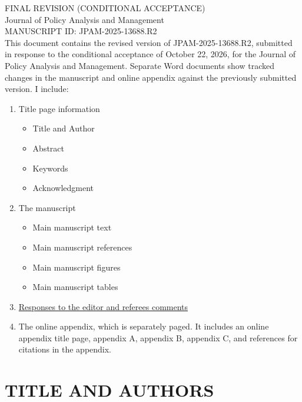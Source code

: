 \documentclass[12pt,english]{article}
\begin{document}
\thispagestyle{empty}
\begingroup
  \doublespacing
  \centering
  \LARGE FINAL REVISION (CONDITIONAL ACCEPTANCE)\\[0.25em]
  \LARGE Journal of Policy Analysis and Management \\[0.25em]
  \LARGE MANUSCRIPT ID: JPAM-2025-13688.R2 \\[1.0em]
\endgroup
This document contains the revised version of JPAM-2025-13688.R2, submitted in response to the conditional acceptance of October 22, 2026, for the Journal of Policy Analysis and Management. Separate Word documents show tracked changes in the manuscript and online appendix against the previously submitted version. I include:
\begin{enumerate}
    \item Title page information
    \begin{itemize}
        \item Title and Author
        \item Abstract
        \item Keywords
        \item Acknowledgment
    \end{itemize}
    \item The manuscript
    \begin{itemize}
        \item Main manuscript text
        \item Main manuscript references
        \item Main manuscript figures
        \item Main manuscript tables
    \end{itemize}  
    \item \hyperref[rr:responses]{Responses to the editor and referees comments}
    \item The online appendix, which is separately paged. It includes an online appendix title page, appendix A, appendix B, appendix C, and references for citations in the appendix.
\end{enumerate}
\clearpage



\setcounter{page}{1}

\section*{TITLE AND AUTHORS}
\end{document}
